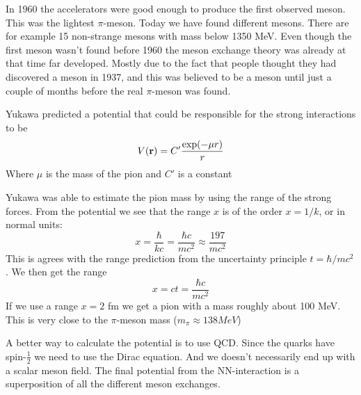 In 1960 the accelerators were good enough to produce the first observed meson. This was the lightest
$\pi$-meson. Today we have found  different mesons.
There are for example 15 non-strange mesons with mass below 1350 MeV. %
Even though the first meson wasn't found before
1960 the meson exchange theory was already at that time far developed. Mostly due to the fact that people 
thought they had discovered a meson in 1937, and this was believed to be a meson until just a couple of months 
before the real $\pi$-meson was found.

Yukawa predicted a potential that could be responsible for the strong interactions to be
\begin{equation}\label{eq:Yukawa}
V({\bf r})=C'\frac{\exp ({-{ \mu r})}}{{ r}}
\end{equation}
%
Where $\mu$ is the mass of the pion and $C'$ is a constant 

Yukawa was able to estimate the pion mass by using the range of the strong forces.
From the potential we see that the range $x$ is of the order $x=1/k$, or in normal units:
\begin{equation}
x=\frac{\hbar}{kc}=\frac{\hbar c}{mc^2} \approx \frac{197}{mc^2}
\end{equation}
%
This is agrees with the range prediction from the uncertainty principle $t=\hbar/mc^2$. 
We then get the range 
\begin{equation}
x=ct=\frac{\hbar c}{mc^2}
\end{equation}
%
%
If we use a range $x=2$ fm we get a pion with a mass roughly about 100 MeV.
This is very close to the $\pi$-meson mass ($m_\pi\approx138MeV$) 

A better way to calculate the potential is to use QCD. Since the quarks have spin-$\frac{1}{2}$ we need to use
the Dirac equation. And we doesn't necessarily end up with a scalar meson field.
The final potential from the NN-interaction is a superposition of all the different meson exchanges.

